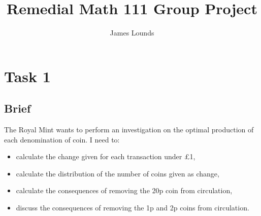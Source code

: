 \documentclass{article}
\author{James Lounds}
\title{Remedial Math 111 Group Project}
\begin{document}
\maketitle
\newpage

\section{Task 1}
\subsection{Brief}
The Royal Mint wants to perform an investigation on the optimal production of each denomination of coin.
\newline
I need to:
\begin{itemize}
    \item calculate the change given for each transaction under £1,

    \item calculate the distribution of the number of coins given as change,
    \item calculate the consequences of removing the 20p coin from circulation,
    \item discuss the consequences of removing the 1p and 2p coins from circulation.
\end{itemize}
\end{document}
